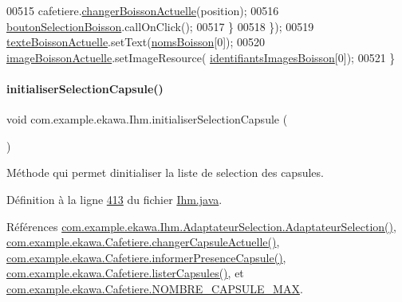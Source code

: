 \begin{DoxyCode}
00515                 cafetiere.\hyperlink{classcom_1_1example_1_1ekawa_1_1_cafetiere_a50775b093a7f6d1b0fe8ad3662d80fc5}{changerBoissonActuelle}(position);
00516                 \hyperlink{classcom_1_1example_1_1ekawa_1_1_ihm_a5aec848e98e7bd8b933b87e390de809e}{boutonSelectionBoisson}.callOnClick();
00517             \}
00518         \});
00519         \hyperlink{classcom_1_1example_1_1ekawa_1_1_ihm_a6655fee013d48228f2c7981f1cd8f74e}{texteBoissonActuelle}.setText(\hyperlink{classcom_1_1example_1_1ekawa_1_1_ihm_abafa700d1d1f943bd3e9678f698ed33a}{nomsBoisson}[0]);
00520         \hyperlink{classcom_1_1example_1_1ekawa_1_1_ihm_a2d83809a52b5f9a97f7817ae183c456d}{imageBoissonActuelle}.setImageResource(
      \hyperlink{classcom_1_1example_1_1ekawa_1_1_ihm_aab3ed36de15018dd29af2df4b3e150e4}{identifiantsImagesBoisson}[0]);
00521     \}
\end{DoxyCode}
\mbox{\label{classcom_1_1example_1_1ekawa_1_1_ihm_a32a1b0d802eef67b6c838d8839de7bdb}} 
\paragraph{\texorpdfstring{initialiser\+Selection\+Capsule()}{initialiserSelectionCapsule()}}
{\footnotesize\ttfamily void com.\+example.\+ekawa.\+Ihm.\+initialiser\+Selection\+Capsule (\begin{DoxyParamCaption}{ }\end{DoxyParamCaption})\hspace{0.3cm}{\ttfamily [private]}}



Méthode qui permet d\textquotesingle{}initialiser la liste de selection des capsules. 



Définition à la ligne \hyperlink{_ihm_8java_source_l00413}{413} du fichier \hyperlink{_ihm_8java_source}{Ihm.\+java}.



Références \hyperlink{_ihm_8java_source_l00156}{com.\+example.\+ekawa.\+Ihm.\+Adaptateur\+Selection.\+Adaptateur\+Selection()}, \hyperlink{_cafetiere_8java_source_l00212}{com.\+example.\+ekawa.\+Cafetiere.\+changer\+Capsule\+Actuelle()}, \hyperlink{_cafetiere_8java_source_l00316}{com.\+example.\+ekawa.\+Cafetiere.\+informer\+Presence\+Capsule()}, \hyperlink{_cafetiere_8java_source_l00184}{com.\+example.\+ekawa.\+Cafetiere.\+lister\+Capsules()}, et \hyperlink{_cafetiere_8java_source_l00029}{com.\+example.\+ekawa.\+Cafetiere.\+N\+O\+M\+B\+R\+E\+\_\+\+C\+A\+P\+S\+U\+L\+E\+\_\+\+M\+AX}.



